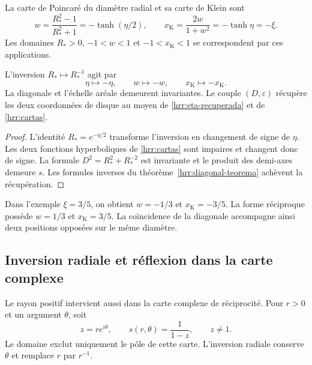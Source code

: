 La carte de Poincaré du diamètre radial et sa carte de Klein sont
\begin{equation}
 w=\frac{R_*^2-1}{R_*^2+1}
   =-\tanh(\eta/2),\qquad
 x_{\mathrm K}=\frac{2w}{1+w^2}=-\tanh\eta=-\xi.
 \label{hrr:cartas}
\end{equation}
Les domaines \(R_*>0\), \(-1<w<1\) et \(-1<x_{\mathrm K}<1\) se correspondent par ces applications.

\begin{proposition}
\label{hrr:reciprocidad-cartas} L’inversion \(R_*\mapsto R_*^{-1}\) agit par
\[
 \eta\mapsto-\eta,\qquad w\mapsto-w,
 \qquad x_{\mathrm K}\mapsto-x_{\mathrm K}.
\]
La diagonale et l’échelle aréale demeurent invariantes. Le couple \((D,\varepsilon)\) récupère les deux coordonnées de disque au moyen de \eqref{hrr:eta-recuperada} et de \eqref{hrr:cartas}.
\end{proposition}
\begin{proof}
L’identité \(R_*=e^{-\eta/2}\) transforme l’inversion en changement de signe de \(\eta\). Les deux fonctions hyperboliques de \eqref{hrr:cartas} sont impaires et changent donc de signe. La formule \(D^2=R_*^2+R_*^{-2}\) est invariante et le produit des demi-axes demeure \(s\). Les formules inverses du théorème~\ref{hrr:diagonal-teorema} achèvent la récupération.
\end{proof}

Dans l’exemple \(\xi=3/5\), on obtient \(w=-1/3\) et \(x_{\mathrm K}=-3/5\). La forme réciproque possède \(w=1/3\) et \(x_{\mathrm K}=3/5\). La coïncidence de la diagonale accompagne ainsi deux positions opposées sur le même diamètre.

\subsection{Inversion radiale et réflexion dans la carte complexe}

Le rayon positif intervient aussi dans la carte complexe de réciprocité. Pour \(r>0\) et un argument \(\theta\), soit
\[
 z=re^{i\theta},\qquad s(r,\theta)=\frac1{1-z},
 \qquad z\neq1.
\]
Le domaine exclut uniquement le pôle de cette carte. L’inversion radiale conserve \(\theta\) et remplace \(r\) par \(r^{-1}\).

